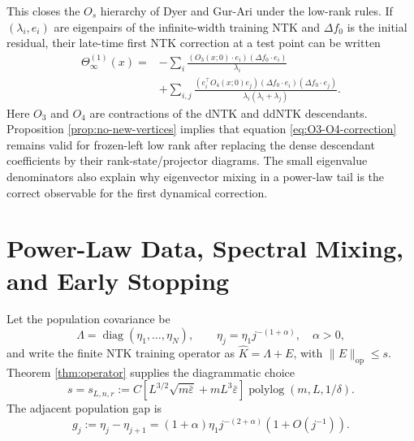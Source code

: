 \documentclass{article}
\newcommand{\diag}{\operatorname{diag}}
\newcommand{\op}{\mathrm{op}}
\newcommand{\wh}{\widehat}
\newcommand{\barE}{\bar\varepsilon}
\begin{document}
This closes the \(O_s\) hierarchy of Dyer and Gur-Ari \citep{DyerGurAri2019} under the low-rank rules.  If \((\lambda_i,e_i)\) are eigenpairs of the infinite-width training NTK and \(\Delta f_0\) is the initial residual, their late-time first NTK correction at a test point can be written
\begin{align}
\Theta_\infty^{(1)}(x)
={}&-\sum_i\frac{(O_3(x;0)\cdot e_i)(\Delta f_0\cdot e_i)}{\lambda_i}
\nonumber\\
&+\sum_{i,j}\frac{(e_i^\top O_4(x;0)e_j)
(\Delta f_0\cdot e_i)(\Delta f_0\cdot e_j)}
{\lambda_i(\lambda_i+\lambda_j)}.
\label{eq:O3-O4-correction}
\end{align}
Here \(O_3\) and \(O_4\) are contractions of the dNTK and ddNTK descendants.  Proposition \ref{prop:no-new-vertices} implies that equation \eqref{eq:O3-O4-correction} remains valid for frozen-left low rank after replacing the dense descendant coefficients by their rank-state/projector diagrams.  The small eigenvalue denominators also explain why eigenvector mixing in a power-law tail is the correct observable for the first dynamical correction.

\section{Power-Law Data, Spectral Mixing, and Early Stopping}
\label{sec:powerlaw}
Let the population covariance be
\begin{equation}
\Lambda=\diag(\eta_1,\ldots,\eta_N),
\qquad \eta_j=\eta_1j^{-(1+\alpha)},\quad \alpha>0,
\label{eq:powerlaw-spectrum}
\end{equation}
and write the finite NTK training operator as \(\wh K=\Lambda+E\), with
\(\|E\|_{\op}\le s\).  Theorem \ref{thm:operator} supplies the diagrammatic choice
\begin{equation}
s=s_{L,n,r}:=
C\left[L^{3/2}\sqrt{m\barE}+mL^3\barE\right]
\operatorname{polylog}(m,L,1/\delta).
\label{eq:diagrammatic-s}
\end{equation}
The adjacent population gap is
\begin{equation}
g_j:=\eta_j-\eta_{j+1}
=(1+\alpha)\eta_1j^{-(2+\alpha)}(1+O(j^{-1})).
\label{eq:powerlaw-gap}
\end{equation}
\end{document}
